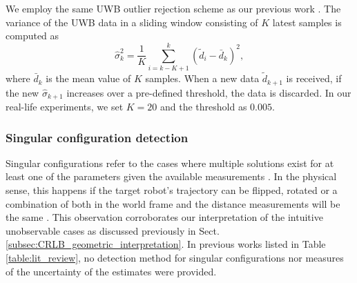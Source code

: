 \documentclass[journal]{IEEEtran}
\begin{document}
We employ the same UWB outlier rejection scheme as our previous work \cite{Thien2021multiviro}. The variance of the UWB data in a sliding window consisting of $K$ latest samples is computed as
\begin{equation}
    \hat{\sigma}_k^2 = \frac{1}{K}\sum\limits_{i=k-K+1}^{k}(\tilde{d}_i - \bar{d}_k)^2,
\end{equation}
where $\bar{d}_k$ is the mean value of $K$ samples. When a new data $\tilde{d}_{k+1}$ is received, if the new $\hat{\sigma}_{k+1}$ increases over a pre-defined threshold, the data is discarded. In our real-life experiments, we set $K=20$ and the threshold as $0.005$.%




\subsubsection{Singular configuration detection}\label{subsubsec:UncertaintyEst}
Singular configurations refer to the cases where multiple solutions exist for at least one of the parameters given the available measurements \cite{trawny2010rel3Dtransform}. In the physical sense, this happens if the target robot's trajectory can be flipped, rotated or a combination of both in the world frame and the distance measurements will be the same \cite{cornejo2015distributed}. This observation corroborates our interpretation of the intuitive unobservable cases as discussed previously in Sect. \ref{subsec:CRLB_geometric_interpretation}. In previous works listed in Table \ref{table:lit_review}, no detection method for singular configurations nor measures of the uncertainty of the estimates were provided. 
\end{document}
